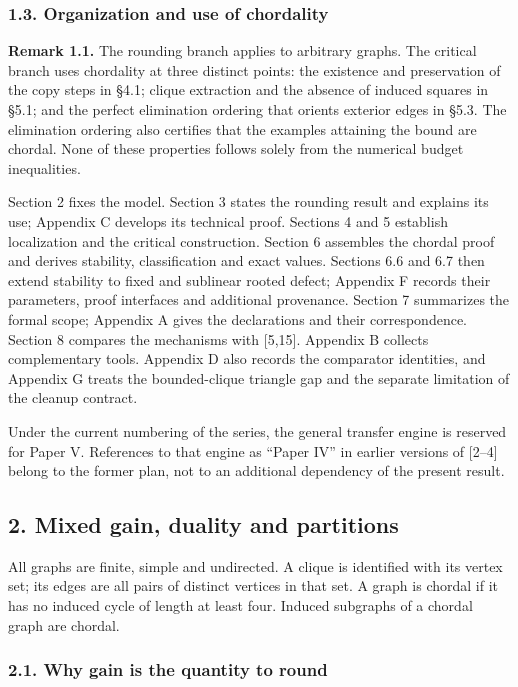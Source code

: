 \documentclass[english,11pt,a4paper]{article}
\begin{document}
\subsubsection{1.3. Organization and use of chordality}\label{organization-and-use-of-chordality}

\textbf{Remark 1.1.} The rounding branch applies to arbitrary graphs. The critical branch uses chordality at three distinct points: the existence and preservation of the copy steps in §4.1; clique extraction and the absence of induced squares in §5.1; and the perfect elimination ordering that orients exterior edges in §5.3. The elimination ordering also certifies that the examples attaining the bound are chordal. None of these properties follows solely from the numerical budget inequalities.

Section 2 fixes the model. Section 3 states the rounding result and explains its use; Appendix C develops its technical proof. Sections 4 and 5 establish localization and the critical construction. Section 6 assembles the chordal proof and derives stability, classification and exact values. Sections 6.6 and 6.7 then extend stability to fixed and sublinear rooted defect; Appendix F records their parameters, proof interfaces and additional provenance. Section 7 summarizes the formal scope; Appendix A gives the declarations and their correspondence. Section 8 compares the mechanisms with {[}5,15{]}. Appendix B collects complementary tools. Appendix D also records the comparator identities, and Appendix G treats the bounded-clique triangle gap and the separate limitation of the cleanup contract.

Under the current numbering of the series, the general transfer engine is reserved for Paper V. References to that engine as ``Paper IV'' in earlier versions of {[}2--4{]} belong to the former plan, not to an additional dependency of the present result.

\subsection{2. Mixed gain, duality and partitions}\label{mixed-gain-duality-and-partitions}

All graphs are finite, simple and undirected. A clique is identified with its vertex set; its edges are all pairs of distinct vertices in that set. A graph is chordal if it has no induced cycle of length at least four. Induced subgraphs of a chordal graph are chordal.

\subsubsection{2.1. Why gain is the quantity to round}\label{why-gain-is-the-quantity-to-round}
\end{document}
